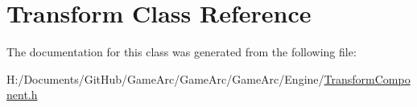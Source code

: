 \hypertarget{class_transform}{\section{Transform Class Reference}
\label{class_transform}
}


The documentation for this class was generated from the following file\+:\begin{DoxyCompactItemize}
\item 
H\+:/\+Documents/\+Git\+Hub/\+Game\+Arc/\+Game\+Arc/\+Game\+Arc/\+Engine/\hyperlink{_transform_component_8h}{Transform\+Component.\+h}\end{DoxyCompactItemize}
